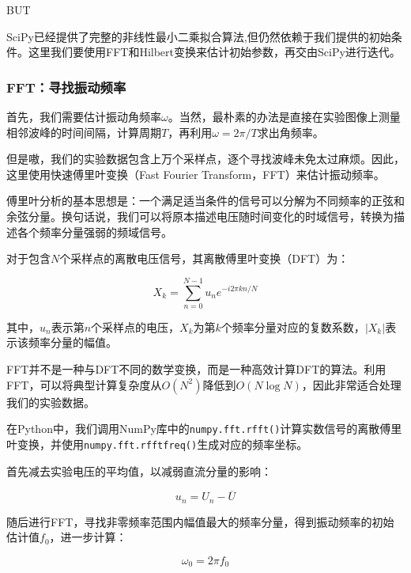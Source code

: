 \documentclass[UTF8]{ctexart}
\begin{document}
\begin{center}
  \large BUT
\end{center}
\noindent SciPy已经提供了完整的非线性最小二乘拟合算法,但仍然依赖于我们提供的初始条件。这里我们要使用FFT和Hilbert变换来估计初始参数，再交由SciPy进行迭代。

\subsubsection{FFT：寻找振动频率}

\noindent 首先，我们需要估计振动角频率$\omega$。当然，最朴素的办法是直接在实验图像上测量相邻波峰的时间间隔，计算周期$T$，再利用$\omega=2\pi/T$求出角频率。

\noindent 但是嗷，我们的实验数据包含上万个采样点，逐个寻找波峰未免太过麻烦。因此，这里使用快速傅里叶变换（Fast Fourier Transform，FFT）来估计振动频率。

\noindent 傅里叶分析的基本思想是：一个满足适当条件的信号可以分解为不同频率的正弦和余弦分量。换句话说，我们可以将原本描述电压随时间变化的时域信号，转换为描述各个频率分量强弱的频域信号。

\noindent 对于包含$N$个采样点的离散电压信号，其离散傅里叶变换（DFT）为：

\begin{equation}
X_k=\sum_{n=0}^{N-1}u_n e^{-i2\pi kn/N}
\end{equation}

\noindent 其中，$u_n$表示第$n$个采样点的电压，$X_k$为第$k$个频率分量对应的复数系数，$|X_k|$表示该频率分量的幅值。

\noindent FFT并不是一种与DFT不同的数学变换，而是一种高效计算DFT的算法。利用FFT，可以将典型计算复杂度从$O(N^2)$降低到$O(N\log N)$，因此非常适合处理我们的实验数据。

\noindent 在Python中，我们调用NumPy库中的\texttt{numpy.fft.rfft()}计算实数信号的离散傅里叶变换，并使用\texttt{numpy.fft.rfftfreq()}生成对应的频率坐标。

\noindent 首先减去实验电压的平均值，以减弱直流分量的影响：

\begin{equation}
u_n=U_n-\overline{U}
\end{equation}

\noindent 随后进行FFT，寻找非零频率范围内幅值最大的频率分量，得到振动频率的初始估计值$f_0$，进一步计算：

\begin{equation}
\boxed{\omega_0=2\pi f_0}
\end{equation}
\end{document}
